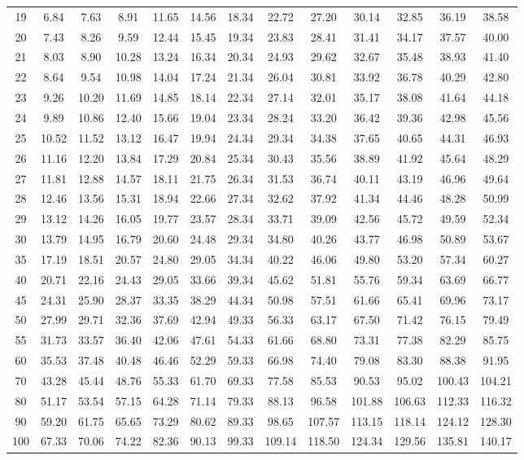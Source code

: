 \begin{center}
\begin{tabular}{c | c c c c c c c c c c c c}
19 & 6.84 & 7.63 & 8.91 & 11.65 & 14.56 & 18.34 & 22.72 & 27.20 & 30.14 & 32.85 & 36.19 & 38.58 \\
20 & 7.43 & 8.26 & 9.59 & 12.44 & 15.45 & 19.34 & 23.83 & 28.41 & 31.41 & 34.17 & 37.57 & 40.00 \\
21 & 8.03 & 8.90 & 10.28 & 13.24 & 16.34 & 20.34 & 24.93 & 29.62 & 32.67 & 35.48 & 38.93 & 41.40 \\
22 & 8.64 & 9.54 & 10.98 & 14.04 & 17.24 & 21.34 & 26.04 & 30.81 & 33.92 & 36.78 & 40.29 & 42.80 \\
23 & 9.26 & 10.20 & 11.69 & 14.85 & 18.14 & 22.34 & 27.14 & 32.01 & 35.17 & 38.08 & 41.64 & 44.18 \\
24 & 9.89 & 10.86 & 12.40 & 15.66 & 19.04 & 23.34 & 28.24 & 33.20 & 36.42 & 39.36 & 42.98 & 45.56 \\
25 & 10.52 & 11.52 & 13.12 & 16.47 & 19.94 & 24.34 & 29.34 & 34.38 & 37.65 & 40.65 & 44.31 & 46.93 \\
26 & 11.16 & 12.20 & 13.84 & 17.29 & 20.84 & 25.34 & 30.43 & 35.56 & 38.89 & 41.92 & 45.64 & 48.29 \\
27 & 11.81 & 12.88 & 14.57 & 18.11 & 21.75 & 26.34 & 31.53 & 36.74 & 40.11 & 43.19 & 46.96 & 49.64 \\
28 & 12.46 & 13.56 & 15.31 & 18.94 & 22.66 & 27.34 & 32.62 & 37.92 & 41.34 & 44.46 & 48.28 & 50.99 \\
29 & 13.12 & 14.26 & 16.05 & 19.77 & 23.57 & 28.34 & 33.71 & 39.09 & 42.56 & 45.72 & 49.59 & 52.34 \\
30 & 13.79 & 14.95 & 16.79 & 20.60 & 24.48 & 29.34 & 34.80 & 40.26 & 43.77 & 46.98 & 50.89 & 53.67 \\
35 & 17.19 & 18.51 & 20.57 & 24.80 & 29.05 & 34.34 & 40.22 & 46.06 & 49.80 & 53.20 & 57.34 & 60.27 \\
40 & 20.71 & 22.16 & 24.43 & 29.05 & 33.66 & 39.34 & 45.62 & 51.81 & 55.76 & 59.34 & 63.69 & 66.77 \\
45 & 24.31 & 25.90 & 28.37 & 33.35 & 38.29 & 44.34 & 50.98 & 57.51 & 61.66 & 65.41 & 69.96 & 73.17 \\
50 & 27.99 & 29.71 & 32.36 & 37.69 & 42.94 & 49.33 & 56.33 & 63.17 & 67.50 & 71.42 & 76.15 & 79.49 \\
55 & 31.73 & 33.57 & 36.40 & 42.06 & 47.61 & 54.33 & 61.66 & 68.80 & 73.31 & 77.38 & 82.29 & 85.75 \\
60 & 35.53 & 37.48 & 40.48 & 46.46 & 52.29 & 59.33 & 66.98 & 74.40 & 79.08 & 83.30 & 88.38 & 91.95 \\
70 & 43.28 & 45.44 & 48.76 & 55.33 & 61.70 & 69.33 & 77.58 & 85.53 & 90.53 & 95.02 & 100.43 & 104.21 \\
80 & 51.17 & 53.54 & 57.15 & 64.28 & 71.14 & 79.33 & 88.13 & 96.58 & 101.88 & 106.63 & 112.33 & 116.32 \\
90 & 59.20 & 61.75 & 65.65 & 73.29 & 80.62 & 89.33 & 98.65 & 107.57 & 113.15 & 118.14 & 124.12 & 128.30 \\
100 & 67.33 & 70.06 & 74.22 & 82.36 & 90.13 & 99.33 & 109.14 & 118.50 & 124.34 & 129.56 & 135.81 & 140.17 \\
\end{tabular}
\end{center}